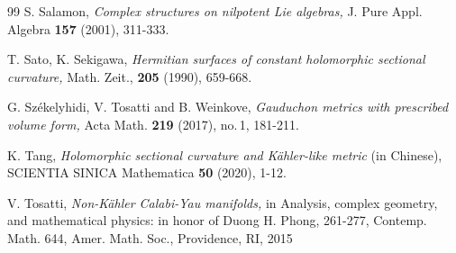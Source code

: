 \documentclass{amsart}
\begin{document}
\begin{thebibliography}{99}
 S. Salamon, \emph{Complex structures on nilpotent Lie algebras,} J. Pure Appl. Algebra {\bf 157} (2001), 311-333.





 T. Sato, K. Sekigawa, \emph{Hermitian surfaces of constant holomorphic sectional curvature,} Math. Zeit., {\bf 205} (1990), 659-668.












 G. Sz\'ekelyhidi, V. Tosatti and B. Weinkove, \emph {Gauduchon metrics with prescribed volume form,}  Acta Math. {\bf 219} (2017), no.\,1, 181-211.



 K. Tang, \emph{Holomorphic sectional curvature and K\"ahler-like metric} (in Chinese),  SCIENTIA SINICA Mathematica {\bf 50} (2020), 1-12.




 V. Tosatti, \emph{Non-K\"ahler Calabi-Yau manifolds,} in Analysis, complex geometry, and mathematical physics: in honor of Duong H. Phong, 261-277, Contemp. Math. 644, Amer. Math. Soc., Providence, RI, 2015


\end{thebibliography}
\end{document}
